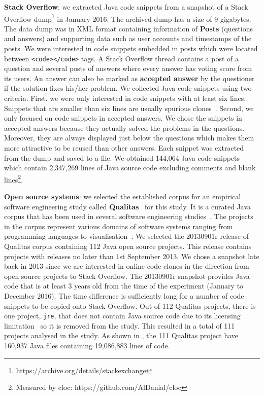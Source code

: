 \documentclass[sigconf,review, anonymous]{acmart}
\begin{document}
\textbf{Stack Overflow}: we extracted Java code snippets from a snapshot of a Stack Overflow dump\footnote{https://archive.org/details/stackexchange} in January 2016. The archived dump has a size of 9 gigabytes. The data dump was in XML format containing information of \textbf{Posts} (questions and answers) and supporting data such as user accounts and timestamps of the posts. We were interested in code snippets embedded in posts which were located between {\small\texttt{<code></code>}} tags. A Stack Overflow thread contains a post of a question and several posts of answers where every answer has voting score from its users. An answer can also be marked as \textbf{accepted answer} by the questioner if the solution fixes his/her problem. We collected Java code snippets using two criteria. First, we were only interested in code snippets with at least six lines. Snippets that are smaller than six lines are usually spurious clones~\cite{Bellon2007}. Second, we only focused on code snippets in accepted answers. We chose the snippets in accepted answers because they actually solved the problems in the questions. Moreover, they are always displayed just below the questions which makes them more attractive to be reused than other answers. Each snippet was extracted from the dump and saved to a file. 
We obtained 144,064 Java code snippets which contain 2,347,269 lines of Java source code excluding comments and blank lines\footnote{Measured by cloc: https://github.com/AlDanial/cloc}.

\textbf{Open source systems}: we selected the established corpus for an empirical software engineering study called \textbf{Qualitas}~\cite{QualitasCorpus} for this study. It is a curated Java corpus that has been used in several software engineering studies~\cite{Taube-Schock2011,Beckman2011,Vasilescu2011,Omar2012}. The projects in the corpus represent various domains of software systems ranging from programming languages to visualisation~\cite{QualitasCorpus}. We selected the 20130901r release of Qualitas corpus containing 112 Java open source projects. This release contains projects with releases no later than 1st September 2013. We chose a snapshot late back in 2013 since we are interested in online code clones in the direction from open source projects to Stack Overflow. The 20130901r snapshot provides Java code that is at least 3 years old from the time of the experiment (January to December 2016). The time difference is sufficiently long for a number of code snippets to be copied onto Stack Overflow. Out of 112 Qualitas projects, there is one project, \texttt{jre}, that does not contain Java source code due to its licensing limitation~\cite{QualitasCorpus} so it is removed from the study. This resulted in a total of 111 projects analysed in the study. As shown in , the 111 Qualitas project have 160,937 Java files containing 19,086,883 lines of code. %
\end{document}
